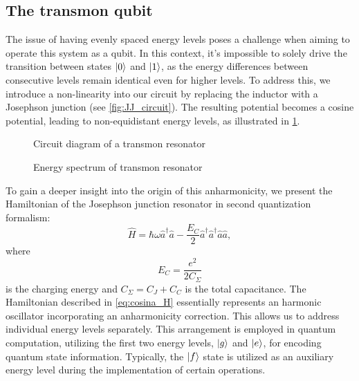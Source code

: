 \subsection{The transmon qubit}

The issue of having evenly spaced energy levels poses a challenge when aiming to operate this system as a qubit.
In this context, it's impossible to solely drive the transition between states $\ket{0}$ and $\ket{1}$, as the energy differences between consecutive levels remain identical even for higher levels.
To address this, we introduce a non-linearity into our circuit by replacing the inductor with a Josephson junction \cite{JOSEPHSON} (see \cref{fig:JJ_circuit}).
The resulting potential becomes a cosine potential, leading to non-equidistant energy levels, as illustrated in \cref{fig:Energy_spectrum_JJ}.
\begin{figure}
    \begin{minipage}[b]{0.5\linewidth}
      \centering
        
        \vspace{-0.8cm}
        \caption{Circuit diagram of a transmon resonator}
        \label{fig:JJ_circuit}
    \end{minipage}
    \hfill
    \begin{minipage}[b]{0.45\linewidth}
      \centering
      
      \vspace{-1.2cm}
      \caption{Energy spectrum of transmon resonator}
      \label{fig:Energy_spectrum_JJ}
    \end{minipage}
  \end{figure}

To gain a deeper insight into the origin of this anharmonicity, we present the Hamiltonian of the Josephson junction resonator in second quantization formalism:
\begin{equation}
\label{eq:cosina_H}
    \hat{H} = 
    \hbar \omega \hat{a}^\dagger \hat{a} - 
    \frac{E_C}{2}\hat{a}^\dagger\hat{a}^\dagger\hat{a}\hat{a} ,
\end{equation}
where
\begin{equation}
    E_C = \frac{e^2}{2 C_\Sigma}
\end{equation} 
is the charging energy and $C_\Sigma = C_J + C_C$ is the total capacitance.
The Hamiltonian described in \cref{eq:cosina_H} essentially represents an harmonic oscillator incorporating an anharmonicity correction. 
This allows us to address individual energy levels separately.
This arrangement is employed in quantum computation, utilizing the first two energy levels, $\ket{g}$ and $\ket{e}$, for encoding quantum state information. 
Typically, the $\ket{f}$ state is utilized as an auxiliary energy level during the implementation of certain operations.

